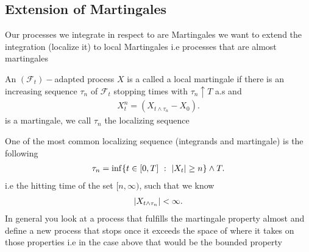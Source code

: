 \subsection{Extension of Martingales}
Our processes we integrate in respect to are Martingales we want to extend the integration (localize it) to local Martingales i.e 
processes that are almost martingales
\begin{definition}
 An $(\mathcal{F}_t)-$adapted process $X$  is a called a local martingale if there is an increasing sequence $\tau_n$ of $\mathcal{F}_t$ stopping times with $\tau_n \uparrow T$ a.s and 
 \begin{align*}
   X^{n}_t = (X_{t \land \tau_n} - X_0) 
 .\end{align*}
 is a martingale, we call $\tau_n$ the localizing sequence
\end{definition}
\begin{example}
One of the most common localizing sequence (integrands and martingale)  is the following 
\begin{align*}
  \tau_n = \inf \{t \in  [0,T]  \ : \ \lvert X_t\rvert \ge  n\}   \land T
.\end{align*}
i.e the hitting time of the set $[n ,\infty)$, such that we know 
\begin{align*}
  \lvert X_{t \land \tau_n}\rvert < \infty
.\end{align*}
In general you look at a process that fulfills the martingale property almost and define a new process that stops once it exceeds the space of where it takes on those properties i.e in the case above
that would be the bounded property
\end{example}

